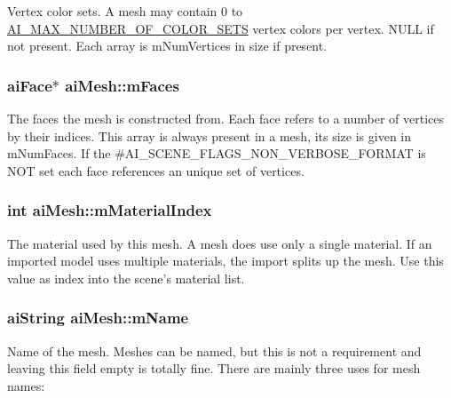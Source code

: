 Vertex color sets. A mesh may contain 0 to \hyperlink{ai_mesh_8h_a74ea1282873ac4b111b48d2380c26bdc}{A\-I\-\_\-\-M\-A\-X\-\_\-\-N\-U\-M\-B\-E\-R\-\_\-\-O\-F\-\_\-\-C\-O\-L\-O\-R\-\_\-\-S\-E\-T\-S} vertex colors per vertex. N\-U\-L\-L if not present. Each array is m\-Num\-Vertices in size if present. \hypertarget{structai_mesh_a5a65fbc7fdea7f8d36f39047425ece07}{
\subsubsection[{m\-Faces}]{ {\bf ai\-Face}$\ast$ ai\-Mesh\-::m\-Faces}}\label{structai_mesh_a5a65fbc7fdea7f8d36f39047425ece07}
The faces the mesh is constructed from. Each face refers to a number of vertices by their indices. This array is always present in a mesh, its size is given in m\-Num\-Faces. If the \#\-A\-I\-\_\-\-S\-C\-E\-N\-E\-\_\-\-F\-L\-A\-G\-S\-\_\-\-N\-O\-N\-\_\-\-V\-E\-R\-B\-O\-S\-E\-\_\-\-F\-O\-R\-M\-A\-T is N\-O\-T set each face references an unique set of vertices. \hypertarget{structai_mesh_aa2807c7ba172115203ed16047ad65f9e}{
\subsubsection[{m\-Material\-Index}]{ {\bf int} ai\-Mesh\-::m\-Material\-Index}}\label{structai_mesh_aa2807c7ba172115203ed16047ad65f9e}
The material used by this mesh. A mesh does use only a single material. If an imported model uses multiple materials, the import splits up the mesh. Use this value as index into the scene's material list. \hypertarget{structai_mesh_a8dd9433e0c5b008e3e5aee6c801d3b74}{
\subsubsection[{m\-Name}]{ {\bf ai\-String} ai\-Mesh\-::m\-Name}}\label{structai_mesh_a8dd9433e0c5b008e3e5aee6c801d3b74}
Name of the mesh. Meshes can be named, but this is not a requirement and leaving this field empty is totally fine. There are mainly three uses for mesh names\-:
